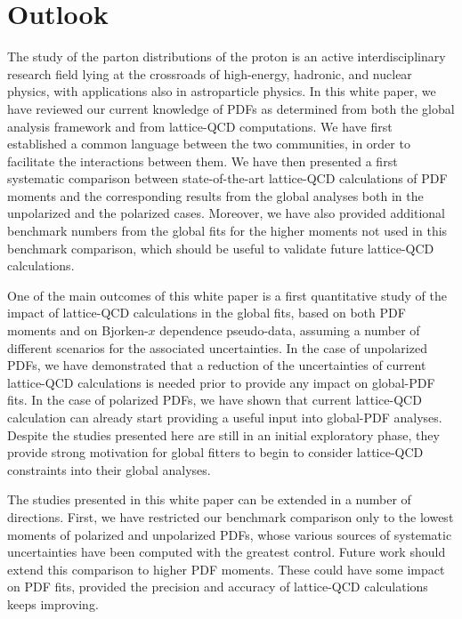 \section{Outlook}
\label{sec:outlook}

The study of the parton distributions
of the proton is an active interdisciplinary research field
lying
at the crossroads of high-energy, 
hadronic, and nuclear physics, with applications also in astroparticle physics.
%
In this white paper, we have reviewed our current knowledge of PDFs as
determined from both the global analysis framework
and from lattice-QCD computations. 
%
We have first established a common language
between the two communities, in order to facilitate the
interactions between them.
%
We have then presented a first systematic comparison between state-of-the-art 
lattice-QCD calculations of PDF moments and the corresponding results from the
global analyses both in the unpolarized and the polarized cases.
%
Moreover, we have also provided additional benchmark numbers from the global fits for the higher moments 
not used in this benchmark comparison, which should be useful
to validate future lattice-QCD calculations.

One of the main outcomes of this white paper is a first
quantitative study of the impact of lattice-QCD calculations
in the 
global fits, based on both PDF moments and  on Bjorken-$x$ dependence pseudo-data,
assuming a number of different scenarios for
the associated uncertainties.
%
In the case of unpolarized PDFs, we have demonstrated that a reduction 
of the uncertainties of current lattice-QCD calculations is needed 
prior to provide any impact on global-PDF fits.
%
In the case of polarized PDFs, we have shown that current lattice-QCD
calculation can already start providing a useful input into global-PDF analyses.
%
Despite the studies presented here are still in an initial exploratory phase, they provide
strong motivation for global fitters to begin to consider lattice-QCD
constraints into their global analyses.

The studies presented in this white paper can be extended in a number of 
directions.
%
First, we have restricted our benchmark comparison only to the lowest moments 
of polarized and unpolarized PDFs, whose various sources of systematic 
uncertainties have been computed with the greatest control.
%
Future work should extend this comparison to higher PDF moments.
%
These could have some impact on PDF fits, provided the precision and accuracy
of lattice-QCD calculations keeps improving.

